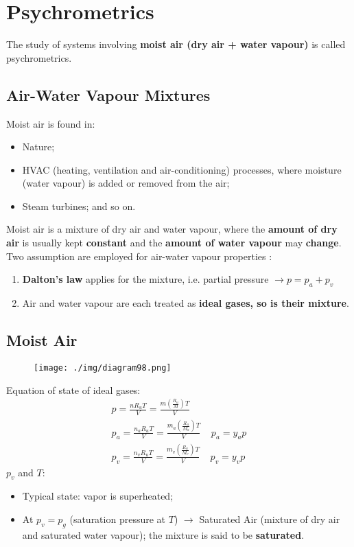 \chapter{Psychrometrics}
The study of systems involving \textbf{moist air (dry air + water vapour)} is called psychrometrics.
\section{Air-Water Vapour Mixtures}
Moist air is found in:
\begin{itemize}[noitemsep]
  \item Nature;
  \item HVAC (heating, ventilation and air-conditioning) processes, where moisture (water vapour) is added or removed from the air;
  \item Steam turbines; and so on.
\end{itemize}
Moist air is a mixture of dry air and water vapour, where the \textbf{amount of dry air} is usually kept \textbf{constant} and the \textbf{amount of water vapour} may \textbf{change}. Two assumption are employed for air-water vapour properties :
\begin{enumerate}[noitemsep]
  \item \textbf{Dalton’s law} applies for the mixture, i.e. partial pressure $\longrightarrow p = p_a + p_v$
  \item Air and water vapour are each treated as \textbf{ideal gases, so is their mixture}.
\end{enumerate}
\section{Moist Air}
\begin{figure}[H]
  \centering
  \texttt{[image: ./img/diagram98.png]}
  \caption{}
\end{figure}
Equation of state of ideal gases:
\begin{gather}
  p = \frac{n R_u T}{V} = \frac{m(\frac{R_u}{M})T}{V} \\[5pt]
  p_a = \frac{n_a R_u T}{V} = \frac{m_a(\frac{R_u}{M_a})T}{V} \ \ \ \ \ p_a = y_ap\\[5pt]
  p_v = \frac{n_v R_u T}{V} = \frac{m_v(\frac{R_u}{M_v})T}{V} \ \ \ \ \ p_v = y_vp
\end{gather}
$p_v$ and $T$:
\begin{itemize}[noitemsep]
  \item Typical state: vapor is superheated;
  \item At $p_v = p_g$ (saturation pressure at $T$) $\longrightarrow$ Saturated Air (mixture of dry air and saturated water vapour); the mixture is said to be \textbf{saturated}.
\end{itemize}
